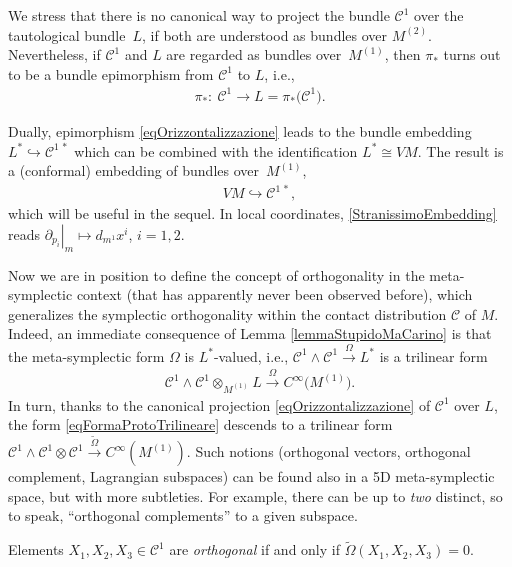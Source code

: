 \documentclass[10pt,a4paper]{amsart}
\newcommand{\C}{\mathcal{C}}
\numberwithin{equation}{section}
\begin{document}
We stress that there is no canonical way to project the bundle $\C^1$ over the tautological bundle~$L$, if both are understood as bundles over $M^{(2)}$. Nevertheless, if $\C^1$ and $L$ are regarded as bundles over~$M^{(1)}$, then $\pi_*$ turns out to be a bundle epimorphism from $\C^1$ to $L$, i.e.,
 \begin{gather}\label{eqOrizzontalizzazione}
 \pi_*\colon\ \C^1\longrightarrow L=\pi_*\big(\C^1\big).
\end{gather}

Dually, epimorphism \eqref{eqOrizzontalizzazione} leads to the bundle embedding $L^\ast \hookrightarrow \C^{1\,\ast}$ which can be combined with the identif\/ication $L^\ast\cong VM$. The result is a (conformal) embedding of bundles over~$M^{(1)}$,
\begin{gather}\label{StranissimoEmbedding}
VM\hookrightarrow \C^{1\,\ast},
\end{gather}
which will be useful in the sequel.
In local coordinates, \eqref{StranissimoEmbedding} reads
$
\left. \partial_{p_i} \right|_{m}\longmapsto d_{m^1}x^i$, $ i=1,2
$.

Now we are in position to def\/ine the concept of orthogonality in the meta-symplectic context
(that has apparently never been observed before), which
generalizes the symplectic orthogonality within the contact distribution $\C$ of $M$. Indeed, an immediate consequence of Lemma \ref{lemmaStupidoMaCarino} is that
the meta-symplectic form $\Omega$ is $L^\ast$-valued, i.e., $\C^1\wedge\C^1\stackrel{\Omega}{\longrightarrow}L^\ast$ is a trilinear form
\begin{gather}\label{eqFormaProtoTrilineare}
\C^1\wedge\C^1\otimes_{M^{(1)}}L\stackrel{\Omega}{\longrightarrow}C^\infty\big(M^{(1)}\big).
\end{gather}
In turn, thanks to
the canonical projection \eqref{eqOrizzontalizzazione} of $\C^1$ over $L$, the form \eqref{eqFormaProtoTrilineare} descends to a
trilinear form $\C^1\wedge\C^1\otimes \C^1\stackrel{\widetilde{\Omega}}{\longrightarrow}C^\infty(M^{(1)})$.
Such notions (orthogonal vectors, orthogonal complement, Lagrangian subspaces) can be found also in a 5D meta-symplectic space, but with more subtleties. For example, there can be up to \emph{two} distinct, so to speak, ``orthogonal complements'' to a given subspace.

\begin{Definition}\label{defTriOrt}
Elements $X_1,X_2,X_3\in \C^1$ are \emph{orthogonal} if and only if
$\widetilde{\Omega}(X_1,X_2,X_3)=0$.
\end{Definition}
\end{document}
